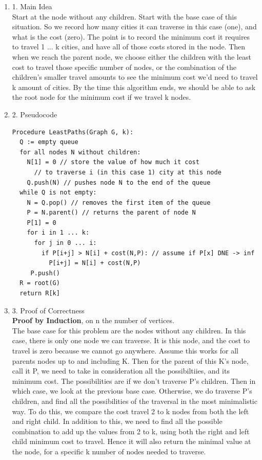 \documentclass[11pt]{article}
\newenvironment{qparts}{\begin{enumerate}[{(}a{)}]}{\end{enumerate}}
\begin{document}
\begin{qparts}
\item[1.] Main Idea \\
Start at the node without any children. Start with the base case of this situation. So we record how many cities it can traverse in this case (one), and what is the cost (zero). The point is to record the minimum cost it requires to travel 1 ... k cities, and have all of those costs stored in the node. Then when we reach the parent node, we choose either the children with the least cost to travel those specific number of nodes, or the combination of the children's smaller travel amounts to see the minimum cost we'd need to travel k amount of cities. By the time this algorithm ends, we should be able to ask the root node for the minimum cost if we travel k nodes. 
\item[2.] Pseudocode 
\begin{verbatim}
Procedure LeastPaths(Graph G, k):
  Q := empty queue
  for all nodes N without children:
    N[1] = 0 // store the value of how much it cost
      // to traverse i (in this case 1) city at this node
    Q.push(N) // pushes node N to the end of the queue
  while Q is not empty:
    N = Q.pop() // removes the first item of the queue
    P = N.parent() // returns the parent of node N
    P[1] = 0
    for i in 1 ... k:
      for j in 0 ... i:
        if P[i+j] > N[i] + cost(N,P): // assume if P[x] DNE -> inf
          P[i+j] = N[i] + cost(N,P)
     P.push()
  R = root(G) 
  return R[k]
\end{verbatim}
\item[3.] Proof of Correctness \\
\textbf{Proof by Induction}, on n the number of vertices. \\
The base case for this problem are the nodes without any children. In this case, there is only one node we can traverse. It is this node, and the cost to travel is zero because we cannot go anywhere. Assume this works for all parents nodes up to and including K. Then for the parent of this K's node, call it P, we need to take in consideration all the possibiltiies, and its minimum cost. The possibilities are if we don't traverse P's children. Then in which case, we look at the previous base case. Otherwise, we do traverse P's children, and find all the possibilities of the traversal in the most minimalistic way. To do this, we compare the cost travel 2 to k nodes from both the left and right child. In addition to this, we need to find all the possible combination to add up the values from 2 to k, using both the right and left child minimum cost to travel. Hence it will also return the minimal value at the node, for a specific k number of nodes needed to traverse. \\


\end{qparts}
\end{document}
